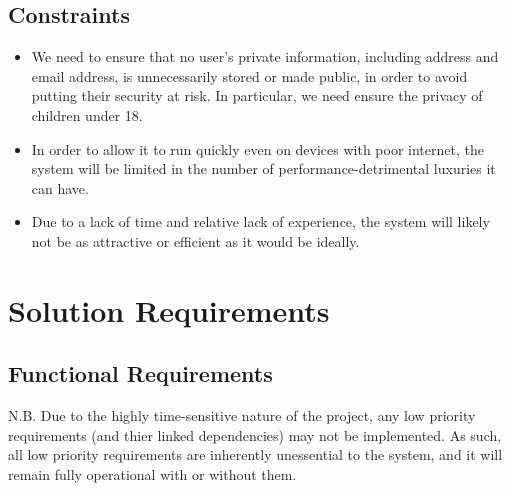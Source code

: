 \documentclass[12pt]{article}
\begin{document}
\subsection{Constraints}
\begin{itemize}

\item We need to ensure that no user’s private information, including address and email address, is unnecessarily stored or made public, in order to avoid putting their security at risk. In particular, we need ensure the privacy of children under 18.

\item In order to allow it to run quickly even on devices with poor internet, the system will be limited in the number of performance-detrimental luxuries it can have.

\item Due to a lack of time and relative lack of experience, the system will likely not be as attractive or efficient as it would be ideally.

\end{itemize}

\section{Solution Requirements}
\subsection{Functional Requirements}
N.B. Due to the highly time-sensitive nature of the project, any low priority
requirements (and thier linked dependencies) may not be implemented.
As such, all low priority requirements are inherently unessential to the
system, and it will remain fully operational with or without them.

\label{fr:about-us}
\end{document}
